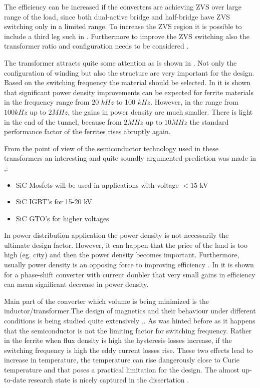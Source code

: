 \documentclass[]{scrartcl}
\begin{document}
 

The efficiency can be increased if the converters are achieving ZVS over large range of the load, since both dual-active bridge and half-bridge have ZVS switching only in  a limited range. To increase the ZVS region it is possible to include a third leg such in \cite{Baars2015}. Furthermore to improve the ZVS switching also the transformer ratio and configuration needs to be considered \cite{Baars2015b}.

The transformer attracts quite some attention as is shown in \cite{Huang2013}. Not only the configuration of winding but also the structure are very important for the design. Based on the switching frequency the material should be selected. In \cite{Hanson2016} it is shown that significant power density improvements can be expected for ferrite materials in the frequency range from 20 $kHz$ to 100 $kHz$. However, in the range from $100 kHz$ up to $2 MHz$, the gains in power density are  much smaller. There is light in the end of the tunnel, because from $2 MHz$ up to $10 MHz$ the standard performance factor of the ferrites rises abruptly again.

From the point of view of the semiconductor technology used in these transformers an interesting and quite soundly argumented prediction was made in \cite{Huang2013},\cite{Rohm2014}:

\begin{itemize}
	\item SiC Mosfets will be used in applications with voltage $<15$ kV
	\item SiC IGBT's for 15-20 kV
	\item SiC GTO's for higher voltages
\end{itemize}



In power distribution application the power density is not necessarily the ultimate design factor. However, it can happen that the price of the land is too high (eg. city) and then the power density becomes important. Furthermore, usually power density is an opposing force to improving efficiency \cite{Biela2009}. In \cite{Biela2009} it is shown for a phase-shift converter with current doubler that very small gains in efficiency can mean significant decrease in power density. 


Main part of the converter which volume is being minimized is the inductor/transformer.The design of magnetics and their behaviour under different conditions is being studied quite extensively \cite{Su2011},\cite{Mu2014}. As was hinted before as it  happens that the semiconductor is not the limiting factor for switching frequency. Rather in the ferrite when flux density is high the hysteresis losses increase, if the switching frequency is high the eddy current losses rise. These two effects lead to increase in temperature, the temperature can rise dangerously close to Curie temperature and that poses a practical limitation for the design. The almost up-to-date research state is nicely captured in the dissertation \cite{Shen2006}. 
\end{document}
